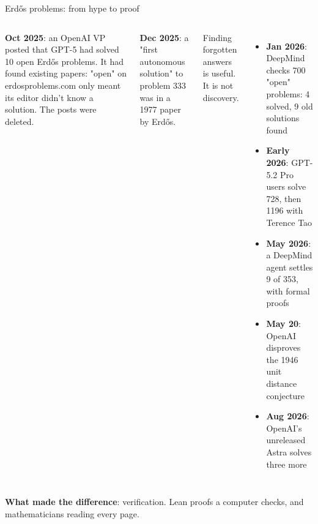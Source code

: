\documentclass[aspectratio=169,11pt,t]{beamer}
\begin{document}
\begin{frame}{Erdős problems: from hype to proof}
  \begin{columns}[T,onlytextwidth]
      \par\vspace{0.3em}\footnotesize
      \textbf{Oct 2025}: an OpenAI VP posted that GPT-5 had solved 10 open Erdős problems. It had found existing papers: "open" on erdosproblems.com only meant its editor didn't know a solution. The posts were deleted.\par\vspace{0.4em}
      \textbf{Dec 2025}: a "first autonomous solution" to problem 333 was in a 1977 paper by Erdős.\par\vspace{0.4em}
      {\color{muted}Finding forgotten answers is useful. It is not discovery.}
      \par\vspace{0.3em}
      \begin{itemize}\footnotesize\setlength\itemsep{0.15em}
        \item \textbf{Jan 2026}: DeepMind checks 700 "open" problems: 4 solved, 9 old solutions found
        \item \textbf{Early 2026}: GPT-5.2 Pro users solve 728, then 1196 with Terence Tao
        \item \textbf{May 2026}: a DeepMind agent settles 9 of 353, with formal proofs
        \item \textbf{May 20}: OpenAI disproves the 1946 unit distance conjecture
        \item \textbf{Aug 2026}: OpenAI's unreleased Astra solves three more
      \end{itemize}
  \end{columns}\par\vspace{0.6em}
  {\small\textbf{What made the difference}: verification. Lean proofs a computer checks, and mathematicians reading every page.}
\end{frame}
\end{document}
